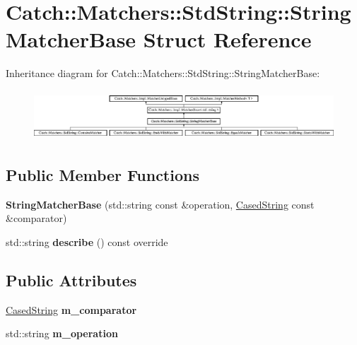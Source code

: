 \hypertarget{structCatch_1_1Matchers_1_1StdString_1_1StringMatcherBase}{}\section{Catch\+::Matchers\+::Std\+String\+::String\+Matcher\+Base Struct Reference}
\label{structCatch_1_1Matchers_1_1StdString_1_1StringMatcherBase}
Inheritance diagram for Catch\+::Matchers\+::Std\+String\+::String\+Matcher\+Base\+:\begin{figure}[H]
\begin{center}
\leavevmode
\includegraphics[height=1.879195cm]{structCatch_1_1Matchers_1_1StdString_1_1StringMatcherBase}
\end{center}
\end{figure}
\subsection*{Public Member Functions}
\begin{DoxyCompactItemize}
\item 
\mbox{\label{structCatch_1_1Matchers_1_1StdString_1_1StringMatcherBase_a3a9b66bae298ae27058478529b4bb39d}} 
{\bfseries String\+Matcher\+Base} (std\+::string const \&operation, \mbox{\hyperlink{structCatch_1_1Matchers_1_1StdString_1_1CasedString}{Cased\+String}} const \&comparator)
\item 
\mbox{\label{structCatch_1_1Matchers_1_1StdString_1_1StringMatcherBase_a47af030f8cea42a601ffb1000eea5cca}} 
std\+::string {\bfseries describe} () const override
\end{DoxyCompactItemize}
\subsection*{Public Attributes}
\begin{DoxyCompactItemize}
\item 
\mbox{\label{structCatch_1_1Matchers_1_1StdString_1_1StringMatcherBase_a17c9f0fe40587070ffe998c193742831}} 
\mbox{\hyperlink{structCatch_1_1Matchers_1_1StdString_1_1CasedString}{Cased\+String}} {\bfseries m\+\_\+comparator}
\item 
\mbox{\label{structCatch_1_1Matchers_1_1StdString_1_1StringMatcherBase_a7a25c4b7d863e9a1c406d81efd0f83ca}} 
std\+::string {\bfseries m\+\_\+operation}
\end{DoxyCompactItemize}
